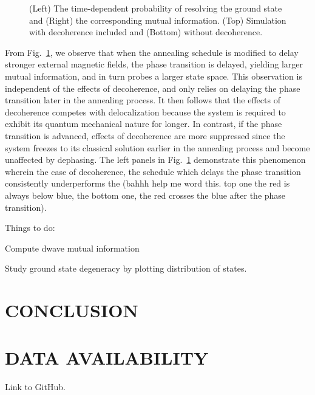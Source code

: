 \documentclass[prd,twocolumn,tightenlines,preprintnumbers,showpacs,superscriptaddress,notitlepage,nofootinbib,eqsecnum,floatfix,longbibliography]{revtex4}
\begin{document}
\begin{figure}
    \caption{(Left) The time-dependent probability of resolving the ground state and (Right) the corresponding mutual information.
(Top) Simulation with decoherence included and (Bottom) without decoherence.}
    \label{fig:prob_mi}
\end{figure}

From Fig.~\ref{fig:prob_mi}, we observe that when the annealing schedule is modified to delay stronger external magnetic fields, the phase transition is delayed, yielding larger mutual information, and in turn probes a larger state space.
This observation is independent of the effects of decoherence, and only relies on delaying the phase transition later in the annealing process.
It then follows that the effects of decoherence competes with delocalization because the system is required to exhibit its quantum mechanical nature for longer.
In contrast, if the phase transition is advanced, effects of decoherence are more suppressed since the system freezes to its classical solution earlier in the annealing process and become unaffected by dephasing. The left panels in Fig.~\ref{fig:prob_mi} demonstrate this phenomenon wherein the case of decoherence, the schedule which delays the phase transition consistently underperforms the (bahhh help me word this.
top one the red is always below blue, the bottom one, the red crosses the blue after the phase transition).

Things to do:

Compute dwave mutual information

Study ground state degeneracy by plotting distribution of states.

\section{CONCLUSION}
\label{sec:conclusion}


\section{DATA AVAILABILITY}
\label{sec:open-source}

Link to GitHub.

\end{document}

